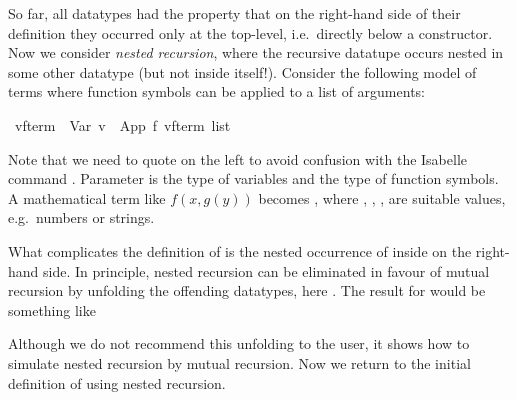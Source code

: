 %
\begin{isabellebody}%
\def\isabellecontext{Nested}%
%
\begin{isamarkuptext}%
So far, all datatypes had the property that on the right-hand side of their
definition they occurred only at the top-level, i.e.\ directly below a
constructor. Now we consider \emph{nested recursion}, where the recursive
datatupe occurs nested in some other datatype (but not inside itself!).
Consider the following model of terms
where function symbols can be applied to a list of arguments:%
\end{isamarkuptext}%
\ {\isacharparenleft}{\isacharprime}v{\isacharcomma}{\isacharprime}f{\isacharparenright}{\isachardoublequote}term{\isachardoublequote}\ {\isacharequal}\ Var\ {\isacharprime}v\ {\isacharbar}\ App\ {\isacharprime}f\ {\isachardoublequote}{\isacharparenleft}{\isacharprime}v{\isacharcomma}{\isacharprime}f{\isacharparenright}term\ list{\isachardoublequote}%
\begin{isamarkuptext}%
\noindent
Note that we need to quote  on the left to avoid confusion with
the Isabelle command .
Parameter  is the type of variables and  the type of
function symbols.
A mathematical term like $f(x,g(y))$ becomes , where , , ,  are
suitable values, e.g.\ numbers or strings.

What complicates the definition of  is the nested occurrence of
 inside  on the right-hand side. In principle,
nested recursion can be eliminated in favour of mutual recursion by unfolding
the offending datatypes, here . The result for 
would be something like
\medskip


\medskip

\noindent
Although we do not recommend this unfolding to the user, it shows how to
simulate nested recursion by mutual recursion.
Now we return to the initial definition of  using
nested recursion.


\end{isamarkuptext}
\end{isabellebody}
